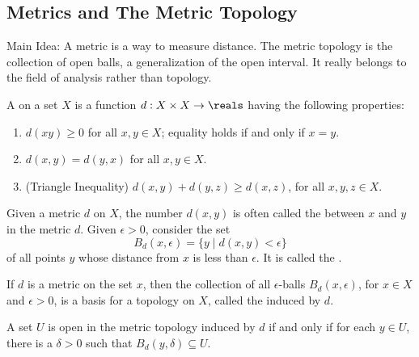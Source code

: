 
\newpage

\subsection{Metrics and The Metric Topology}

Main Idea: A metric is a way to measure distance. The metric 
topology is the collection of open balls, a generalization of the 
open interval. It really belongs to the field of analysis rather 
than topology.

\begin{definition}[Metric]
	A  on a set $X$ is a function 
	$d: X \times X \to \reals$ having the following properties:
	\begin{enumerate}
		\item $d(xy) \geq 0$ for all $x,y \in X$; equality holds if 
		and only if $x = y$.
		
		\item $d(x,y) = d(y,x)$ for all $x,y \in X$.
		
		\item (Triangle Inequality) $d(x,y) + d(y,z) \geq d(x,z)$, 
		for all $x,y,z \in X$.
	\end{enumerate}
\end{definition}

\begin{definition}
	Given a metric $d$ on $X$, the number $d(x,y)$ is often called 
	the  between $x$ and $y$ in the metric $d$. Given 
	$\epsilon > 0$, consider the set
	\[
		B_d(x,\epsilon) = \{ y \mid d(x,y) < \epsilon \}
	\]
	of all points $y$ whose distance from $x$ is less than 
	$\epsilon$. It is called the .
\end{definition}

\begin{definition}
	If $d$ is a metric on the set $x$, then the collection of all 
	$\epsilon$-balls $B_d(x,\epsilon)$, for $x \in X$ and $\epsilon 
	> 0$, is a basis for a topology on $X$, called the  induced by $d$.
\end{definition}

A set $U$ is open in the metric topology induced by $d$ if and only 
if for each $y \in U$, there is a $\delta > 0$ such that 
$B_d(y,\delta) \subseteq U$.

